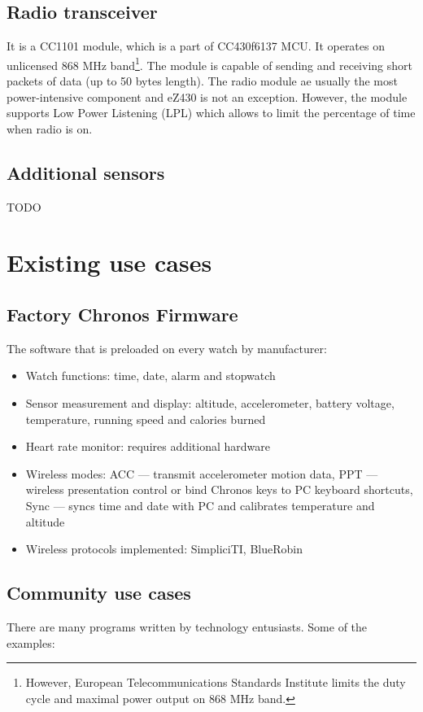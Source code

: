 \subsection{Radio transceiver}

It is a CC1101 module, which is a part of CC430f6137 MCU.
It operates on unlicensed 868 MHz band\footnote{However, European Telecommunications Standards Institute limits the duty cycle and maximal power output on 868 MHz band.}.
The module is capable of sending and receiving short packets of data (up to 50 bytes length).
The radio module ae usually the most power-intensive component and eZ430 is not an exception.
However, the module supports Low Power Listening (LPL) which allows to limit the percentage of time when radio is on.

\subsection{Additional sensors}

TODO 

\section{Existing use cases}

\subsection{Factory Chronos Firmware}

The software that is preloaded on every watch by manufacturer:
\begin{itemize}
  \item Watch functions: time, date, alarm and stopwatch
  \item Sensor measurement and display: altitude, accelerometer, battery voltage, temperature, running speed and calories burned
  \item Heart rate monitor: requires additional hardware
  \item Wireless modes: ACC --- transmit accelerometer motion data, PPT --- wireless presentation control or bind Chronos keys to PC keyboard shortcuts, Sync --- syncs time and date with PC and calibrates temperature and altitude
  \item Wireless protocols implemented: SimpliciTI, BlueRobin
\end{itemize}

\subsection{Community use cases}
There are many programs written by technology entusiasts. Some of the examples:

